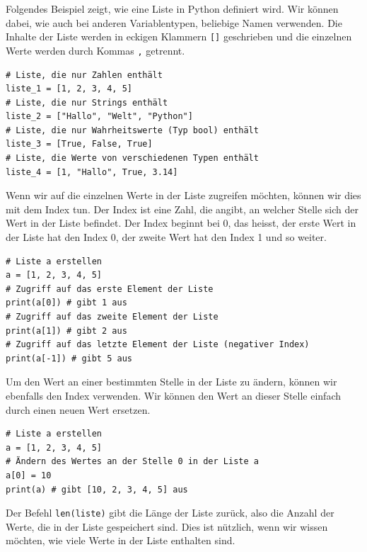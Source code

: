 \begin{myexample}
	Folgendes Beispiel zeigt, wie eine Liste in Python definiert wird. Wir können dabei, wie auch bei anderen Variablentypen, beliebige Namen verwenden. Die Inhalte der Liste werden in eckigen Klammern \lstinline|[]| geschrieben und die einzelnen Werte werden durch Kommas \lstinline|,| getrennt.
	\begin{lstlisting}
# Liste, die nur Zahlen enthält
liste_1 = [1, 2, 3, 4, 5]
# Liste, die nur Strings enthält
liste_2 = ["Hallo", "Welt", "Python"]
# Liste, die nur Wahrheitswerte (Typ bool) enthält
liste_3 = [True, False, True]
# Liste, die Werte von verschiedenen Typen enthält
liste_4 = [1, "Hallo", True, 3.14]
\end{lstlisting}
\end{myexample}
\begin{myexample}
	Wenn wir auf die einzelnen Werte in der Liste zugreifen möchten, können wir dies mit dem Index tun. Der Index ist eine Zahl, die angibt, an welcher Stelle sich der Wert in der Liste befindet. Der Index beginnt bei 0, das heisst, der erste Wert in der Liste hat den Index 0, der zweite Wert hat den Index 1 und so weiter.
	\begin{lstlisting}
# Liste a erstellen
a = [1, 2, 3, 4, 5]
# Zugriff auf das erste Element der Liste
print(a[0]) # gibt 1 aus
# Zugriff auf das zweite Element der Liste
print(a[1]) # gibt 2 aus
# Zugriff auf das letzte Element der Liste (negativer Index)
print(a[-1]) # gibt 5 aus
\end{lstlisting}
\end{myexample}
\begin{myexample}
	Um den Wert an einer bestimmten Stelle in der Liste zu ändern, können wir ebenfalls den Index verwenden. Wir können den Wert an dieser Stelle einfach durch einen neuen Wert ersetzen.
	\begin{lstlisting}
# Liste a erstellen
a = [1, 2, 3, 4, 5]
# Ändern des Wertes an der Stelle 0 in der Liste a
a[0] = 10
print(a) # gibt [10, 2, 3, 4, 5] aus
\end{lstlisting}
\end{myexample}
\begin{myexample}
	Der Befehl \lstinline|len(liste)| gibt die Länge der Liste zurück, also die Anzahl der Werte, die in der Liste gespeichert sind. Dies ist nützlich, wenn wir wissen möchten, wie viele Werte in der Liste enthalten sind.
\end{myexample}

